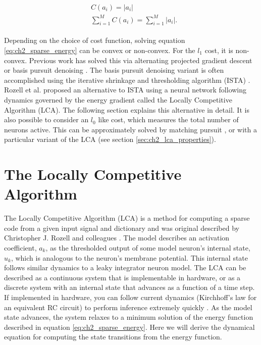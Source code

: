 \begin{align}\label{eq:ch2_l1_cost}
\begin{split}
  &C(a_{i}) = |a_{i}| \\
  &\sum\limits_{i=1}^{M}C(a_{i}) = \sum\limits_{i=1}^{M}|a_{i}|.
\end{split}
\end{align}

Depending on the choice of cost function, solving equation \eqref{eq:ch2_sparse_energy} can be convex or non-convex. For the $l_{1}$ cost, it is non-convex. Previous work has solved this via alternating projected gradient descent \parencite{olshausen1997sparse} or basis pursuit denoising \parencite{chen2001atomic}. The basis pursuit denoising variant is often accomplished using the iterative shrinkage and thresholding algorithm (ISTA) \parencite{daubechies2004iterative, beck2009fast}. Rozell et al. \citeyearpar{rozell2008sparse} proposed an alternative to ISTA using a neural network following dynamics governed by the energy gradient called the Locally Competitive Algorithm (LCA). The following section explains this alternative in detail. It is also possible to consider an $l_{0}$ like cost, which measures the total number of neurons active. This can be approximately solved by matching pursuit \parencite{davis1997adaptive, rehn2007network, rebollo2002optimized}, or with a particular variant of the LCA (see section \ref{sec:ch2_lca_properties}).


\section{The Locally Competitive Algorithm}\label{sec:ch2_lca}
The Locally Competitive Algorithm (LCA) is a method for computing a sparse code from a given input signal and dictionary and was original described by Christopher J. Rozell and colleagues \citeyearpar{rozell2008sparse}. The model describes an activation coefficient, $a_{k}$, as the thresholded output of some model neuron's internal state, $u_{k}$, which is analogous to the neuron's membrane potential. This internal state follows similar dynamics to a leaky integrator neuron model. The LCA can be described as a continuous system that is implementable in hardware, or as a discrete system with an internal state that advances as a function of a time step. If implemented in hardware, you can follow current dynamics (Kirchhoff's law for an equivalent RC circuit) to perform inference extremely quickly \parencite{rozell2008sparse}. As the model state advances, the system relaxes to a minimum solution of the energy function described in equation \eqref{eq:ch2_sparse_energy}. Here we will derive the dynamical equation for computing the state transitions from the energy function.

